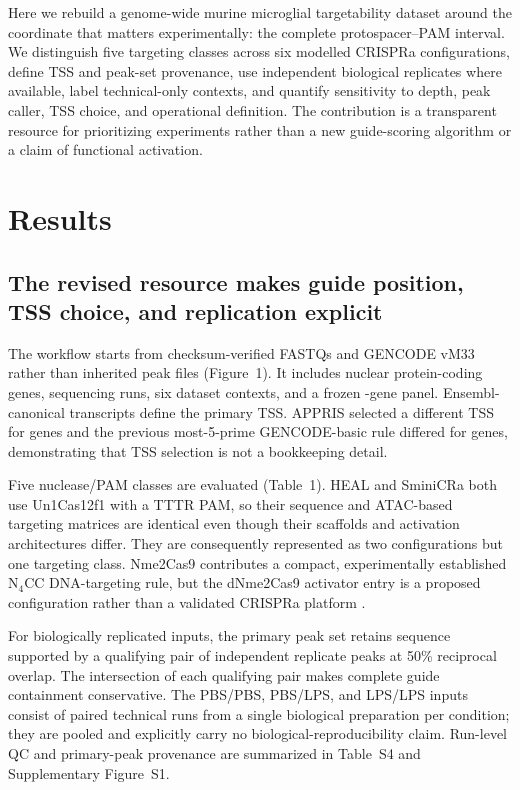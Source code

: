 \documentclass[11pt]{article}
\begin{document}
Here we rebuild a genome-wide murine microglial targetability dataset around the coordinate that matters experimentally: the complete protospacer--PAM interval. We distinguish five targeting classes across six modelled CRISPRa configurations, define TSS and peak-set provenance, use independent biological replicates where available, label technical-only contexts, and quantify sensitivity to depth, peak caller, TSS choice, and operational definition. The contribution is a transparent resource for prioritizing experiments rather than a new guide-scoring algorithm or a claim of functional activation.

\section{Results}

\subsection{The revised resource makes guide position, TSS choice, and replication explicit}

The workflow starts from checksum-verified FASTQs and GENCODE vM33 rather than inherited peak files (Figure~1). It includes \NGeneFormatted{} nuclear protein-coding genes, \NRun{} sequencing runs, six dataset contexts, and a frozen \NPanel{}-gene panel. Ensembl-canonical transcripts define the primary TSS. APPRIS selected a different TSS for \CanonicalApprisDifferentN{} genes and the previous most-5-prime GENCODE-basic rule differed for \CanonicalLegacyDifferentN{} genes, demonstrating that TSS selection is not a bookkeeping detail.

Five nuclease/PAM classes are evaluated (Table~1). HEAL and SminiCRa both use Un1Cas12f1 with a TTTR PAM, so their sequence and ATAC-based targeting matrices are identical even though their scaffolds and activation architectures differ. They are consequently represented as two configurations but one targeting class. Nme2Cas9 contributes a compact, experimentally established N$_4$CC DNA-targeting rule, but the dNme2Cas9 activator entry is a proposed configuration rather than a validated CRISPRa platform \citep{edraki2019nme2}.

For biologically replicated inputs, the primary peak set retains sequence supported by a qualifying pair of independent replicate peaks at 50\% reciprocal overlap. The intersection of each qualifying pair makes complete guide containment conservative. The PBS/PBS, PBS/LPS, and LPS/LPS inputs consist of paired technical runs from a single biological preparation per condition; they are pooled and explicitly carry no biological-reproducibility claim. Run-level QC and primary-peak provenance are summarized in Table~S4 and Supplementary Figure~S1.
\end{document}
